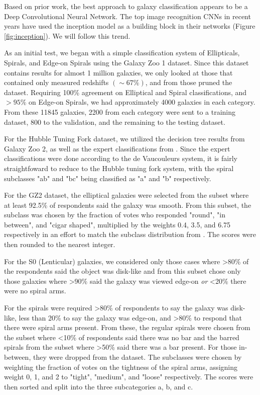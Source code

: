 \documentclass{article}
\begin{document}
Based on prior work, the best approach to galaxy classification appears to be a Deep Convolutional Neural Network. The top image recognition CNNs in recent years have used the inception model \citep{2014arXiv1409.4842S} as a building block in their networks (Figure \ref{fig:inception}). We will follow this trend.

As an initial test, we began with a simple classification system of Ellipticals, Spirals, and Edge-on Spirals using the Galaxy Zoo 1 dataset. Since this dataset contains results for almost 1 million galaxies, we only looked at those that contained only measured redshifts $(\sim 67\%)$, and from those pruned the dataset. Requiring 100\% agreement on Elliptical and Spiral classifications, and $>95\%$ on Edge-on Spirals, we had approximately 4000 galaxies in each category. From these 11845 galaxies, 2200 from each category were sent to a training dataset, 800 to the validation, and the remaining to the testing dataset.

For the Hubble Tuning Fork dataset, we utilized the decision tree results from Galaxy Zoo 2, as well as the expert classifications from \cite{2010ApJS..186..427N}. Since the expert classifications were done according to the de Vaucouleurs system, it is fairly straightfoward to reduce to the Hubble tuning fork system, with the spiral subclasses "ab" and "bc" being classified as "a" and "b" respectively. 

For the GZ2 dataset, the elliptical galaxies were selected from the subset where at least 92.5\% of respondents said the galaxy was smooth. From this subset, the subclass was chosen by the fraction of votes who responded "round", "in between", and "cigar shaped", multiplied by the weights 0.4, 3.5, and 6.75 respectively in an effort to match the subclass distribution from \cite{2010ApJS..186..427N}. The scores were then rounded to the nearest integer.

For the S0 (Lenticular) galaxies, we considered only those cases where >80\% of the respondents said the object was disk-like and from this subset chose only those galaxies where >90\% said the galaxy was viewed edge-on \emph{or} <20\% there were no spiral arms.

For the spirals were required >80\% of respondents to say the galaxy was disk-like, less than 20\% to say the galaxy was edge-on, and >80\% to respond that there were spiral arms present. From these, the regular spirals were chosen from the subset where <10\% of respondents said there was no bar and the barred spirals from the subset where >50\% said there was a bar present. For those in-between, they were dropped from the dataset. The subclasses were chosen by weighting the fraction of votes on the tightness of the spiral arms, assigning weight 0, 1, and 2 to "tight", "medium", and "loose" respectively. The scores were then sorted and split into the three subcategories a, b, and c.
\end{document}
